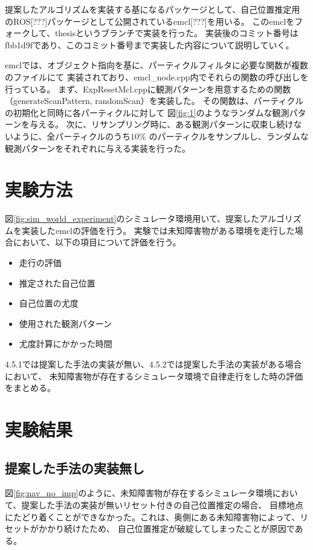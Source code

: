 提案したアルゴリズムを実装する基になるパッケージとして、自己位置推定用
のROS[???]パッケージとして公開されているemcl[???]を用いる。
このemclをフォークして、thesisというブランチで実装を行った。
実装後のコミット番号はfbb1d9fであり、このコミット番号まで実装した内容について説明していく。

emclでは、オブジェクト指向を基に、パーティクルフィルタに必要な関数が複数のファイルにて
実装されており、emcl\_node.cpp内でそれらの関数の呼び出しを行っている。
まず、ExpResetMcl.cppに観測パターンを用意するための関数（generateScanPattern, randomScan）を実装した。
その関数は、パーティクルの初期化と同時に各パーティクルに対して
図\ref{fig:1}のようなランダムな観測パターンを与える。
次に、リサンプリング時に、ある観測パターンに収束し続けないように、全パーティクルのうち$10\%$
のパーティクルをサンプルし、ランダムな観測パターンをそれぞれに与える実装を行った。

\section{実験方法}

図\ref{fig:sim_world_experiment}のシミュレータ環境用いて、提案したアルゴリズムを実装したemclの評価を行う。
実験では未知障害物がある環境を走行した場合において、以下の項目について評価を行う。
\begin{itemize}
  \item 走行の評価
  \item 推定された自己位置
  \item 自己位置の尤度
  \item 使用された観測パターン
  \item 尤度計算にかかった時間
\end{itemize}
4.5.1では提案した手法の実装が無い、4.5.2では提案した手法の実装がある場合において、
未知障害物が存在するシミュレータ環境で自律走行をした時の評価をまとめる。

\newpage

\section{実験結果}

\subsection{提案した手法の実装無し}

図\ref{fig:nav_no_imp}のように、未知障害物が存在するシミュレータ環境において、提案した手法の実装が無いリセット付きの自己位置推定の場合、
目標地点にたどり着くことができなかった。これは、奥側にある未知障害物によって、リセットがかかり続けたため、
自己位置推定が破綻してしまったことが原因である。


